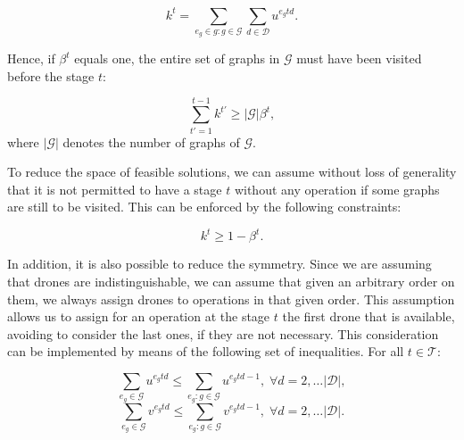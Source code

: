 $$k^t=\sum_{e_g\in g:g\in\mathcal G}\sum_{d\in\mathcal D} u^{e_gtd}.$$

\noindent
Hence, if $\beta^t$ equals one, the entire set of graphs in $\mathcal G$ must have been visited before the stage $t$:

\begin{equation}\tag{VI-1}\label{eq:VI-1}
\sum_{t'=1}^{t-1} k^{t'} \geq |\mathcal G|\beta^t,
\end{equation}
where $|\mathcal G|$ denotes the number of graphs of $\mathcal G$.

\noindent
To reduce the space of feasible solutions, we can assume without loss of generality that it is not permitted to have a stage $t$ without any operation if some graphs are still to be visited. This can be enforced by the following constraints:

\begin{equation}\tag{VI-2}\label{eq:VI-2}
k^t \geq 1 - \beta^t.
\end{equation}

\noindent
In addition, it is also possible to reduce the symmetry. Since we are assuming that drones are indistinguishable, we can assume that given an arbitrary order on them, we always assign drones to operations in that given order. This assumption allows us to assign for an operation at the stage $t$ the first drone that is available, avoiding to consider the last ones, if they are not necessary. This consideration can be implemented by means of the following set of inequalities. For all $t\in\mathcal T$:
\medskip

\begin{equation}\tag{VI-3}\label{eq:VI-3}
\sum_{e_g\in \mathcal G} u^{e_gtd} \leq \sum_{e_g:g\in\mathcal G}u^{e_gtd-1}, \; \forall d=2,\ldots |\mathcal D|,      
\end{equation}
\begin{equation}\tag{VI-4}\label{eq:VI-4}
\sum_{e_g\in \mathcal G} v^{e_gtd} \leq \sum_{e_g:g\in\mathcal G}v^{e_gtd-1}, \; \forall d=2,\ldots |\mathcal D|.      
\end{equation}

